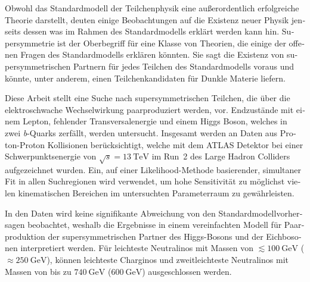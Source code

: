 
\begin{otherlanguage}{ngerman} 
\begin{zusammenfassung}

Obwohl das Standardmodell der Teilchenphysik eine außerordentlich erfolgreiche Theorie darstellt, deuten einige Beobachtungen auf die Existenz neuer Physik jenseits dessen was im Rahmen des Standardmodells erklärt werden kann hin.
Supersymmetrie ist der Oberbegriff für eine Klasse von Theorien, die einige der offenen Fragen des Standardmodells erklären könnten.
Sie sagt die Existenz von supersymmetrischen Partnern für jedes Teilchen des Standardmodells voraus und könnte, unter anderem, einen Teilchenkandidaten für Dunkle Materie liefern. 

Diese Arbeit stellt eine Suche nach supersymmetrischen Teilchen, die über die elektroschwache Wechsel\-wirkung paarproduziert werden, vor.
Endzustände mit einem Lepton, fehlender Transversal\-energie und einem Higgs Boson, welches in zwei \textit{b}-Quarks zerfällt, werden untersucht.
Insgesamt werden \onethirtynineifb an Daten aus Proton-Proton Kollisionen berücksichtigt, welche mit dem ATLAS Detektor bei einer Schwerpunktsenergie von $\sqrt{s}=\SI{13}{\TeV}$ im Run~2 des Large Hadron Colliders aufgezeichnet wurden.
Ein, auf einer Likelihood-Methode basierender, simultaner Fit in allen Suchregionen wird verwendet, um hohe Sensitivität zu möglichst vielen kinematischen Bereichen im untersuchten Parameterraum zu gewährleisten.

In den Daten wird keine signifikante Abweichung von den Standardmodellvorhersagen beobachtet, weshalb die Ergebnisse in einem vereinfachten Modell für Paarproduktion der supersymmetrischen Partner des Higgs-Bosons und der Eichbosonen interpretiert werden.
Für leichteste Neutralinos mit Massen von $\lesssim \SI{100}{\GeV}$ ($\approx\SI{250}{\GeV}$), können leichteste Charginos und zweitleichteste Neutralinos mit Massen von bis zu $\SI{740}{\GeV}$ ($\SI{600}{\GeV}$) ausgeschlossen werden.


\end{zusammenfassung}
\end{otherlanguage}
